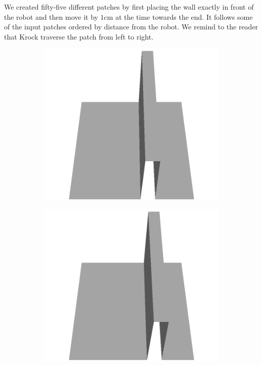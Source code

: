 We created fifty-five different patches by first placing the wall exactly in front of the robot and then move it by $1$cm at the time towards the end. It follows some of the input patches ordered by distance from the robot. We remind to the reader that Krock traverse the patch from left to
 right.
\begin{figure}[H]
    \centering
    \begin{subfigure}[b]{0.24\textwidth}
    \includegraphics[width=\linewidth]{../img/5/custom_patches/walls_front/all/00-3d.png}
    \end{subfigure}
    \begin{subfigure}[b]{0.24\textwidth}
    \includegraphics[width=\linewidth]{../img/5/custom_patches/walls_front/all/04-3d.png}

\end{subfigure}
\end{figure}
